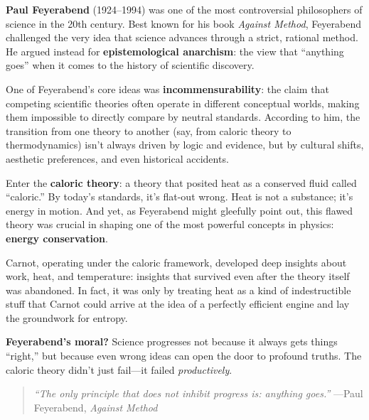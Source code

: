 \begin{tcolorbox}[colback=gray!5!white, colframe=black!75!white, title={Historical Sidebar: Feyerabend, Caloric, and the Accidental Truth of Error}]

  \textbf{Paul Feyerabend} (1924–1994) was one of the most controversial philosophers of science in the 20th century. Best known for his book \textit{Against Method}, Feyerabend challenged the very idea that science advances through a strict, rational method. He argued instead for \textbf{epistemological anarchism}: the view that “anything goes” when it comes to the history of scientific discovery.
  
  \medskip
  
  One of Feyerabend’s core ideas was \textbf{incommensurability}: the claim that competing scientific theories often operate in different conceptual worlds, making them impossible to directly compare by neutral standards. According to him, the transition from one theory to another (say, from caloric theory to thermodynamics) isn’t always driven by logic and evidence, but by cultural shifts, aesthetic preferences, and even historical accidents.
  
  \medskip
  
  Enter the \textbf{caloric theory}: a theory that posited heat as a conserved fluid called “caloric.” By today’s standards, it’s flat-out wrong. Heat is not a substance; it’s energy in motion. And yet, as Feyerabend might gleefully point out, this flawed theory was crucial in shaping one of the most powerful concepts in physics: \textbf{energy conservation}.
  
  \medskip
  
  Carnot, operating under the caloric framework, developed deep insights about work, heat, and temperature: insights that survived even after the theory itself was abandoned. In fact, it was only by treating heat as a kind of indestructible stuff that Carnot could arrive at the idea of a perfectly efficient engine and lay the groundwork for entropy.
  
  \medskip
  
  \textbf{Feyerabend’s moral?} Science progresses not because it always gets things “right,” but because even wrong ideas can open the door to profound truths. The caloric theory didn’t just fail—it failed \textit{productively}.

  \medskip
  
  \begin{quote}
  \textit{“The only principle that does not inhibit progress is: anything goes.”} —Paul Feyerabend, \textit{Against Method}
  \end{quote}
  
\end{tcolorbox}
  

